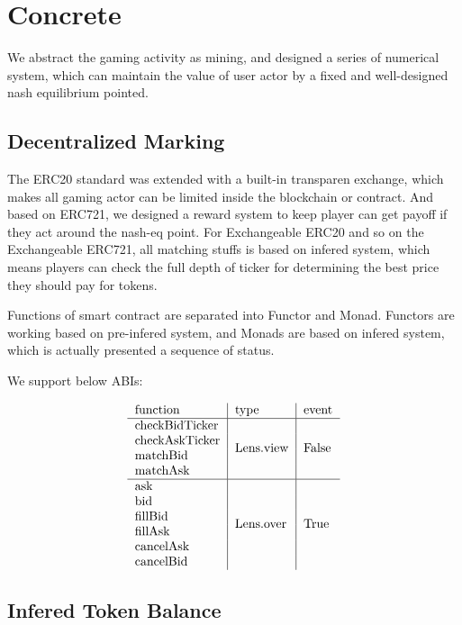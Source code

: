 \documentclass[twocolumn]{article}
\begin{document}
\section {Concrete}

We abstract the gaming activity as mining, and designed a series of numerical system, which can maintain the value of user actor by a fixed and well-designed nash equilibrium pointed.

\subsection {Decentralized Marking}

The ERC20 standard was extended with a built-in transparen exchange, which makes all gaming actor can be limited inside the blockchain or contract. And based on ERC721, we designed a reward system to keep player can get payoff if they act around the nash-eq point. For Exchangeable ERC20 and so on the Exchangeable ERC721, all matching stuffs is based on infered system, which means players can check the full depth of ticker for determining the best price they should pay for tokens.

Functions of smart contract are separated into Functor and Monad. Functors are working based on pre-infered system, and Monads are based on infered system, which is actually presented a sequence of status.

We support below ABIs:

\begin{gather}
\begin{tabular}{l|l|l}
  function & type & event\\
  \hline
  checkBidTicker & \multirow{4}*{Lens.view} & \multirow{4}*{False} \\
  checkAskTicker& \\
  matchBid & \\
  matchAsk &\\
  \hline
  ask & \multirow{6}*{Lens.over} & \multirow{6}*{True} \\
  bid & \\
  fillBid & \\
  fillAsk &\\
  cancelAsk & \\
  cancelBid & \\
\end{tabular}
\end{gather}

\subsection {Infered Token Balance}
\end{document}
